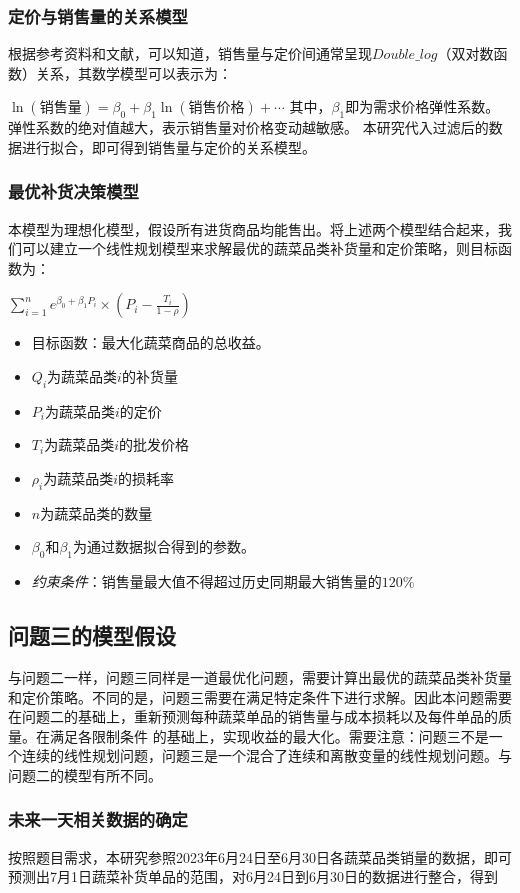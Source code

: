 \documentclass{article}
\begin{document}
\subsubsection{定价与销售量的关系模型}
根据参考资料和文献，可以知道，销售量与定价间通常呈现$Double\_log$（双对数函数）关系，其数学模型可以表示为：

$\ln(\text{销售量}) = \beta_0 + \beta_1 \ln(\text{销售价格}) + \cdots$
其中，$\beta_1$即为需求价格弹性系数。弹性系数的绝对值越大，表示销售量对价格变动越敏感。
本研究代入过滤后的数据进行拟合，即可得到销售量与定价的关系模型。

\subsubsection{最优补货决策模型}
本模型为理想化模型，假设所有进货商品均能售出。将上述两个模型结合起来，我们可以建立一个线性规划模型来求解最优的蔬菜品类补货量和定价策略，则目标函数为：

$ \sum_{i=1}^{n}e^{\beta_0 + \beta_1P_i} \times (P_i -\frac{T_i}{1-\rho} )$
\begin{itemize}
    \item 目标函数：最大化蔬菜商品的总收益。
    \item $Q_i$为蔬菜品类$i$的补货量
    \item $P_i$为蔬菜品类$i$的定价
    \item $T_i$为蔬菜品类$i$的批发价格
    \item $\rho_i$为蔬菜品类$i$的损耗率
    \item $n$为蔬菜品类的数量
    \item $\beta_0$和$\beta_1$为通过数据拟合得到的参数。
    \item \textit{约束条件}：销售量最大值不得超过历史同期最大销售量的$120\%$
\end{itemize}

\subsection{问题三的模型假设}
与问题二一样，问题三同样是一道最优化问题，需要计算出最优的蔬菜品类补货量和定价策略。不同的是，问题三需要在满足特定条件下进行求解。因此本问题需要在问题二的基础上，重新预测每种蔬菜单品的销售量与成本损耗以及每件单品的质量。在满足各限制条件
的基础上，实现收益的最大化。需要注意：问题三不是一个连续的线性规划问题，问题三是一个混合了连续和离散变量的线性规划问题。与问题二的模型有所不同。

\subsubsection{未来一天相关数据的确定}
按照题目需求，本研究参照2023年6月24日至6月30日各蔬菜品类销量的数据，即可预测出7月1日蔬菜补货单品的范围，对6月24日到6月30日的数据进行整合，得到%
\end{document}
